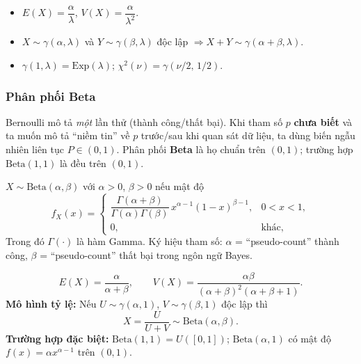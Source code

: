 \documentclass[12pt,a4paper]{article}
\begin{document}
\begin{tinhchat}
  \begin{itemize}
    \item $E(X) = \dfrac{\alpha}{\lambda}$, $V(X) = \dfrac{\alpha}{\lambda^2}$.
    \item $X \sim \gamma(\alpha, \lambda)$ và $Y \sim \gamma(\beta, \lambda)$ độc lập $\Rightarrow X + Y \sim \gamma(\alpha + \beta, \lambda)$.
    \item $\gamma(1, \lambda) = \mathrm{Exp}(\lambda)$; $\chi^2(\nu) = \gamma(\nu/2,\, 1/2)$.
  \end{itemize}
\end{tinhchat}

\subsubsection{Phân phối Beta}

\begin{dongco}[title={Động cơ - Tỷ lệ trên đoạn $(0,1)$}]
Bernoulli mô tả \emph{một} lần thử (thành công/thất bại). Khi tham số $p$ \textbf{chưa biết} và ta muốn mô tả ``niềm tin'' về $p$ trước/sau khi quan sát dữ liệu, ta dùng biến ngẫu nhiên liên tục $P \in (0,1)$. Phân phối \textbf{Beta} là họ chuẩn trên $(0,1)$; trường hợp $\mathrm{Beta}(1,1)$ là đều trên $(0,1)$.
\end{dongco}

\begin{dinhnghia}[title={Phân phối Beta}]
  $X \sim \mathrm{Beta}(\alpha, \beta)$ với $\alpha > 0$, $\beta > 0$ nếu mật độ
  \[
    f_X(x) = \begin{cases}
      \dfrac{\Gamma(\alpha+\beta)}{\Gamma(\alpha)\Gamma(\beta)}\, x^{\alpha-1}(1-x)^{\beta-1}, & 0 < x < 1, \\
      0, & \text{khác},
    \end{cases}
  \]
  Trong đó $\Gamma(\cdot)$ là hàm Gamma. Ký hiệu tham số: $\alpha$ = ``pseudo-count'' thành công, $\beta$ = ``pseudo-count'' thất bại trong ngôn ngữ Bayes.
\end{dinhnghia}

\begin{dinhly}[title={Moment và quan hệ với Gamma}]
  \[
    E(X) = \frac{\alpha}{\alpha+\beta}, \qquad
    V(X) = \frac{\alpha\beta}{(\alpha+\beta)^2(\alpha+\beta+1)}.
  \]
  \textbf{Mô hình tỷ lệ:} Nếu $U \sim \gamma(\alpha, 1)$, $V \sim \gamma(\beta, 1)$ độc lập thì
  \[
    X = \frac{U}{U+V} \sim \mathrm{Beta}(\alpha, \beta).
  \]
  \textbf{Trường hợp đặc biệt:} $\mathrm{Beta}(1,1) = U([0,1])$; $\mathrm{Beta}(\alpha, 1)$ có mật độ $f(x) = \alpha x^{\alpha-1}$ trên $(0,1)$.
\end{dinhly}
\end{document}
